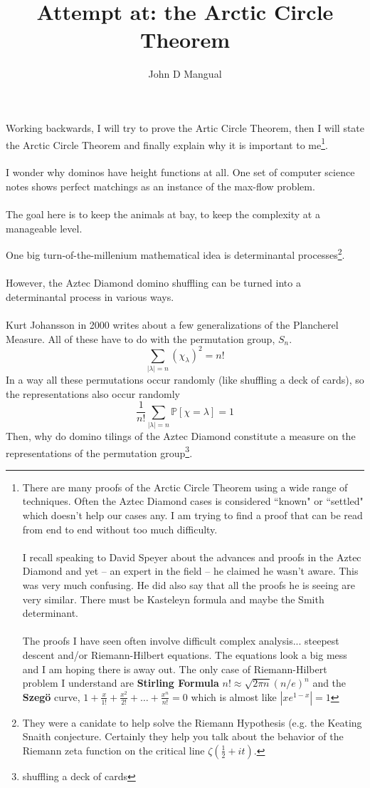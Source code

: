 \documentclass[12pt]{article}
\title{\textbf{ Attempt at: the Arctic Circle Theorem }}
\author{John D Mangual}
\date{}
\begin{document}
\selectfont \fontsize{25}{30}\selectfont

\maketitle

\noindent Working backwards, I will try to prove the Artic Circle Theorem, then I will state the Arctic Circle Theorem and finally explain why it is important to me\footnote{There are many proofs of the Arctic Circle Theorem using a wide range of techniques.  Often the Aztec Diamond cases is considered ``known" or ``settled" which doesn't help our cases any.  I am trying to find a proof that can be read from end to end without too much difficulty. \\ \\ I recall speaking to David Speyer about the advances and proofs in the Aztec Diamond and yet -- an expert in the field -- he claimed he wasn't aware.  This was very much confusing.  He did also say that all the proofs he is seeing are very similar.  There must be Kasteleyn formula and maybe the Smith determinant. \\ \\ The proofs I have seen often involve difficult complex analysis... steepest descent and/or Riemann-Hilbert equations.  The equations look a big mess and I am hoping there is away out.  The only case of Riemann-Hilbert problem I understand are \textbf{Stirling Formula} $n! \approx \sqrt{2\pi n }(n/e)^n$ and the \textbf{Szeg\"{o}} curve, $1 + \frac{x}{1!} + \frac{x^2}{2!} + \dots + \frac{x^n}{n!} = 0$ which is almost like $|x e^{1-x}| = 1 $}. \\ \\
I wonder why dominos have height functions at all.   One set of computer science notes shows perfect matchings as an instance of the max-flow problem. \\ \\
The goal here is to keep the animals at bay, to keep the complexity at a manageable level.

\newpage

\noindent One big turn-of-the-millenium mathematical idea is determinantal processes\footnote{They were a canidate to help solve the Riemann Hypothesis (e.g. the Keating Snaith conjecture.  Certainly they help you talk about the behavior of the Riemann zeta function on the critical line $\zeta(\frac{1}{2} + it)$.}.  \\ \\However, the Aztec Diamond domino shuffling can be turned into a determinantal process in various ways. \\ \\
Kurt Johansson in 2000 writes about a few generalizations of the Plancherel Measure.  All of these have to do with the permutation group, $S_n$.  
$$  \sum_{ |\lambda| = n} ( \chi_\lambda)^2 = n!$$
In a way all these permutations occur randomly (like shuffling a deck of cards), so the representations also occur randomly
$$  \frac{1}{n!} \sum_{ |\lambda| = n} \mathbb{P}[\chi = \lambda ]=1 $$
Then, why do domino tilings of the Aztec Diamond constitute a measure on the representations of the permutation group\footnote{shuffling a deck of cards}.  
\end{document}
